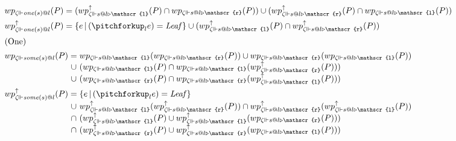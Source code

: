 \begin{figure}[!b]
\begin{align*}
    &wp_{\zeta \Vdash \mathit{one}(s) @ l}(P) = (wp_{\zeta \Vdash s@l\triangleright \mathscr{l}} ^ \uparrow (P) \cap wp_{\zeta \Vdash s@l \triangleright \mathscr{r}}(P)) \cup (wp_{\zeta \Vdash s@l\triangleright \mathscr{r}} ^ \uparrow (P) \cap wp_{\zeta \Vdash s@l \triangleright \mathscr{l}}(P))
    \\
    &wp_{\zeta \Vdash \mathit{one}(s) @ l} ^ \uparrow (P) = \{e \barr (\pitchforkup_l e) = \mathit{Leaf}\} \cup (wp_{\zeta \Vdash s@l\triangleright \mathscr{l}} ^ \uparrow(P) \cap wp_{\zeta \Vdash s@l \triangleright \mathscr{r}}  ^ \uparrow(P))
    \\\intertext{\centering(One)}
    &\begin{array}{@{}l@{\;}c@{\;}l}wp_{\zeta \Vdash \mathit{some}(s) @ l}(P) &=&
    wp_{\zeta \Vdash s@l\triangleright \mathscr{l}}(wp_{\zeta \Vdash s@l \triangleright \mathscr{r}}(P)) \cup wp_{\zeta \Vdash s@l\triangleright \mathscr{r}}(wp_{\zeta \Vdash s@l \triangleright \mathscr{l}} (P)) \\
    &\cup& (wp_{\zeta \Vdash s@l\triangleright \mathscr{l}}(P) \cap wp_{\zeta \Vdash s@l\triangleright \mathscr{l}} (wp_{\zeta \Vdash s@l\triangleright \mathscr{r}}^\uparrow (P)))\\
    &\cup& (wp_{\zeta \Vdash s@l\triangleright \mathscr{r}}(P) \cap wp_{\zeta \Vdash s@l\triangleright \mathscr{r}} (wp_{\zeta \Vdash s@l\triangleright \mathscr{l}}^\uparrow (P)))
    \end{array}
    \\
    &\begin{array}{@{}l@{\;}c@{\;}l}wp_{\zeta \Vdash \mathit{some}(s) @ l} ^ \uparrow (P) &=& \{e \barr (\pitchforkup_l e) = \mathit{Leaf}\}
    \\&\cup& wp_{\zeta \Vdash s@l\triangleright \mathscr{l}}^\uparrow (wp_{\zeta \Vdash s@l \triangleright \mathscr{r}}^\uparrow (P)) \cap wp_{\zeta \Vdash s@l\triangleright \mathscr{r}}^\uparrow (wp_{\zeta \Vdash s@l \triangleright \mathscr{l}}^\uparrow (P)) \\
    &\cap& (wp_{\zeta \Vdash s@l\triangleright \mathscr{l}}^\uparrow(P) \cup wp_{\zeta \Vdash s@l\triangleright \mathscr{l}}^\uparrow (wp_{\zeta \Vdash s@l\triangleright \mathscr{r}} (P)))\\
    &\cap& (wp_{\zeta \Vdash s@l\triangleright \mathscr{r}}^\uparrow(P) \cup wp_{\zeta \Vdash s@l\triangleright \mathscr{r}}^\uparrow (wp_{\zeta \Vdash s@l\triangleright \mathscr{l}}(P)))

\end{array}
\end{align*}
\end{figure}

